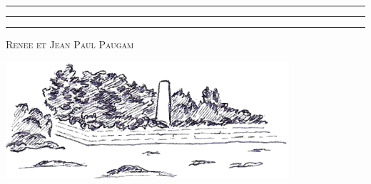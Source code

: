 \documentclass[twoside]{article}
\begin{document}


\begin{titlepage} %
	
	\centering %
	
	
	\rule{\textwidth}{1pt} %
	
	\vspace{2pt}\vspace{-\baselineskip} %
	
	\rule{\textwidth}{0.4pt} %
	
	\vspace{0.1\textheight} %
	
	\color{black}	
	\vspace{0.025\textheight} %
	
	\rule{0.3\textwidth}{0.4pt} %
	
	\vspace{0.1\textheight} %
	
	
	{\Large \textsc{Renee et Jean Paul Paugam}} %
	
	\vfill %
	

	{\includegraphics[scale=1.]{tourBlanche_calque-seul}}
	

\end{titlepage}
\end{document}
